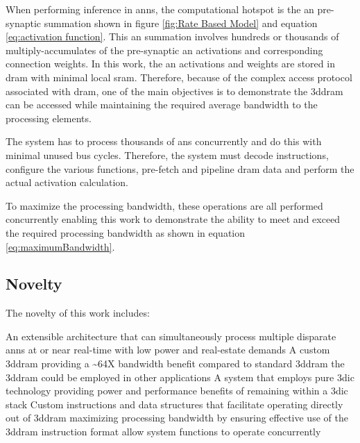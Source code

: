 When performing inference in \acp{ann}, the computational hotspot is the \ac{an} pre-synaptic summation shown in figure \ref{fig:Rate Based Model} and equation \eqref{eq:activation function}.
This \ac{an} summation involves hundreds or thousands of multiply-accumulates of the pre-synaptic \ac{an} activations and corresponding connection weights. 
In this work, the \ac{an} activations and weights are stored in \ac{dram} with minimal local \ac{sram}. 
Therefore, because of the complex access protocol associated with \ac{dram}, one of the main objectives is to demonstrate the \ac{3ddram} can be accessed while maintaining the required average bandwidth to the processing elements.
\iffalse with relatively high levels of bus efficiency. \fi

The system has to process thousands of \acp{an} concurrently and do this with minimal unused bus cycles.
Therefore, the system must decode instructions, configure the various functions, pre-fetch and pipeline \ac{dram} data and perform the actual activation calculation. 

To maximize the processing bandwidth, these operations are all performed concurrently enabling this work to demonstrate the ability to meet and exceed the required \iffalse \SI[per-mode=symbol]{32}{\tera \bit \per \second} of\fi processing bandwidth as shown in equation \eqref{eq:maximumBandwidth}.

\iffalse
The problem associated with processing \acp{ann} are outlined in section \ref{sec:The Problem}. 
\fi

\subsection[Novelty]{Novelty}
\label{sec:Novelty}

The novelty of this work includes:
\begin{outline}
    \1 An extensible architecture that can simultaneously process multiple disparate \ac{ann}s at or near real-time 
      \2 with low power and real-estate demands
    \1 A custom \ac{3ddram} providing a \textasciitilde 64X bandwidth benefit compared to standard \ac{3ddram}
      \2 the \ac{3ddram} could be employed in other applications
    \1 A system that employs pure \ac{3dic} technology
      \2 providing power and performance benefits of remaining within a \ac{3dic} stack
    \1 Custom instructions and data structures that facilitate operating directly out of \ac{3ddram} 
      \2 maximizing processing bandwidth by ensuring effective use of the \ac{3ddram}
      \2 instruction format allow system functions to operate concurrently 
\end{outline}


